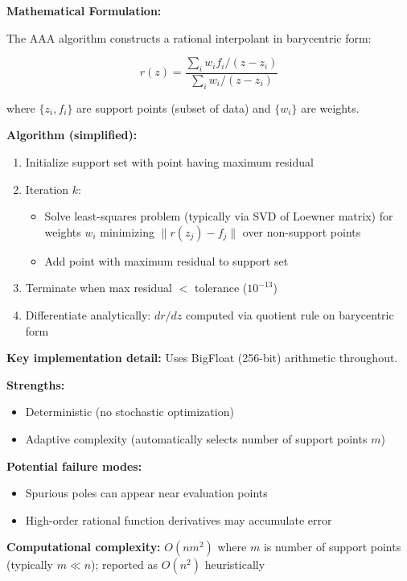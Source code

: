 \textbf{Mathematical Formulation:}

The AAA algorithm constructs a rational interpolant in barycentric form:

\begin{equation}
r(z) = \frac{\sum_i w_i f_i / (z - z_i)}{\sum_i w_i / (z - z_i)}
\end{equation}

where $\{z_i, f_i\}$ are support points (subset of data) and $\{w_i\}$ are weights.

\textbf{Algorithm (simplified):}
\begin{enumerate}
    \item Initialize support set with point having maximum residual
    \item Iteration $k$:
    \begin{itemize}
        \item Solve least-squares problem (typically via SVD of Loewner matrix) for weights $w_i$ minimizing $\|r(z_j) - f_j\|$ over non-support points
        \item Add point with maximum residual to support set
    \end{itemize}
    \item Terminate when max residual $< $ tolerance ($10^{-13}$)
    \item Differentiate analytically: $dr/dz$ computed via quotient rule on barycentric form
\end{enumerate}

\textbf{Key implementation detail:} Uses BigFloat (256-bit) arithmetic throughout.

\textbf{Strengths:}
\begin{itemize}
    \item Deterministic (no stochastic optimization)
    \item Adaptive complexity (automatically selects number of support points $m$)
\end{itemize}

\textbf{Potential failure modes:}
\begin{itemize}
    \item Spurious poles can appear near evaluation points
    \item High-order rational function derivatives may accumulate error
\end{itemize}

\textbf{Computational complexity:} $O(n m^2)$ where $m$ is number of support points (typically $m \ll n$); reported as $O(n^2)$ heuristically

